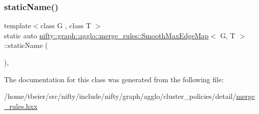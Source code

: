 \subsubsection{\texorpdfstring{static\+Name()}{staticName()}}
{\footnotesize\ttfamily template$<$class G , class T $>$ \\
static auto \hyperlink{classnifty_1_1graph_1_1agglo_1_1merge__rules_1_1SmoothMaxEdgeMap}{nifty\+::graph\+::agglo\+::merge\+\_\+rules\+::\+Smooth\+Max\+Edge\+Map}$<$ G, T $>$\+::static\+Name (\begin{DoxyParamCaption}{ }\end{DoxyParamCaption})\hspace{0.3cm}{\ttfamily [inline]}, {\ttfamily [static]}}



The documentation for this class was generated from the following file\+:\begin{DoxyCompactItemize}
\item 
/home/tbeier/src/nifty/include/nifty/graph/agglo/cluster\+\_\+policies/detail/\hyperlink{merge__rules_8hxx}{merge\+\_\+rules.\+hxx}\end{DoxyCompactItemize}
